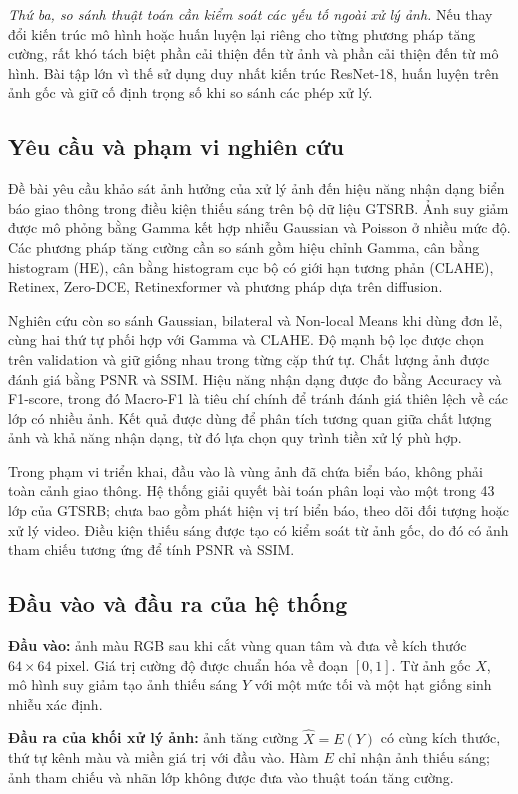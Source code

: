 \textit{Thứ ba, so sánh thuật toán cần kiểm soát các yếu tố ngoài xử lý ảnh.} Nếu thay đổi kiến trúc mô hình hoặc huấn luyện lại riêng cho từng phương pháp tăng cường, rất khó tách biệt phần cải thiện đến từ ảnh và phần cải thiện đến từ mô hình. Bài tập lớn vì thế sử dụng duy nhất kiến trúc ResNet-18, huấn luyện trên ảnh gốc và giữ cố định trọng số khi so sánh các phép xử lý.

\subsection{Yêu cầu và phạm vi nghiên cứu}
Đề bài yêu cầu khảo sát ảnh hưởng của xử lý ảnh đến hiệu năng nhận dạng biển báo giao thông trong điều kiện thiếu sáng trên bộ dữ liệu GTSRB. Ảnh suy giảm được mô phỏng bằng Gamma kết hợp nhiễu Gaussian và Poisson ở nhiều mức độ. Các phương pháp tăng cường cần so sánh gồm hiệu chỉnh Gamma, cân bằng histogram (HE), cân bằng histogram cục bộ có giới hạn tương phản (CLAHE), Retinex, Zero-DCE, Retinexformer và phương pháp dựa trên diffusion.

Nghiên cứu còn so sánh Gaussian, bilateral và Non-local Means khi dùng đơn lẻ, cùng hai thứ tự phối hợp với Gamma và CLAHE. Độ mạnh bộ lọc được chọn trên validation và giữ giống nhau trong từng cặp thứ tự. Chất lượng ảnh được đánh giá bằng PSNR và SSIM. Hiệu năng nhận dạng được đo bằng Accuracy và F1-score, trong đó Macro-F1 là tiêu chí chính để tránh đánh giá thiên lệch về các lớp có nhiều ảnh. Kết quả được dùng để phân tích tương quan giữa chất lượng ảnh và khả năng nhận dạng, từ đó lựa chọn quy trình tiền xử lý phù hợp.

Trong phạm vi triển khai, đầu vào là vùng ảnh đã chứa biển báo, không phải toàn cảnh giao thông. Hệ thống giải quyết bài toán phân loại vào một trong 43 lớp của GTSRB; chưa bao gồm phát hiện vị trí biển báo, theo dõi đối tượng hoặc xử lý video. Điều kiện thiếu sáng được tạo có kiểm soát từ ảnh gốc, do đó có ảnh tham chiếu tương ứng để tính PSNR và SSIM.

\subsection{Đầu vào và đầu ra của hệ thống}
\textbf{Đầu vào:} ảnh màu RGB sau khi cắt vùng quan tâm và đưa về kích thước $64\times64$ pixel. Giá trị cường độ được chuẩn hóa về đoạn $[0,1]$. Từ ảnh gốc $X$, mô hình suy giảm tạo ảnh thiếu sáng $Y$ với một mức tối và một hạt giống sinh nhiễu xác định.

\textbf{Đầu ra của khối xử lý ảnh:} ảnh tăng cường $\widehat{X}=E(Y)$ có cùng kích thước, thứ tự kênh màu và miền giá trị với đầu vào. Hàm $E$ chỉ nhận ảnh thiếu sáng; ảnh tham chiếu và nhãn lớp không được đưa vào thuật toán tăng cường.

